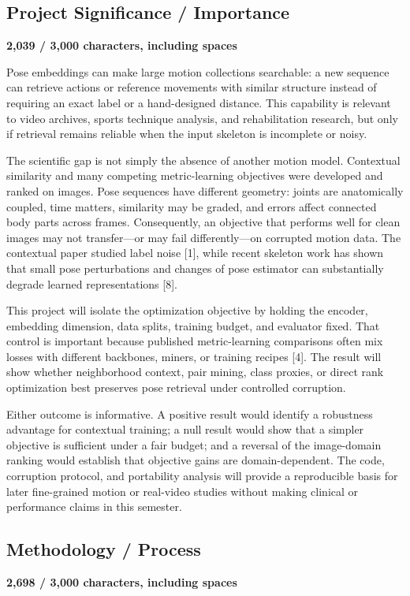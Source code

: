 \documentclass[11pt,letterpaper]{article}
\newcommand{\CharCount}[2]{%
  \begin{flushright}
    \vspace{-7pt}
    {\color{Muted}\bfseries\footnotesize #1 / #2 characters, including spaces}
  \end{flushright}
  \vspace{-3pt}
}
\begin{document}
\subsection*{Project Significance / Importance}
\CharCount{2,039}{3,000}

Pose embeddings can make large motion collections searchable: a new sequence can retrieve actions or reference movements with similar structure instead of requiring an exact label or a hand-designed distance. This capability is relevant to video archives, sports technique analysis, and rehabilitation research, but only if retrieval remains reliable when the input skeleton is incomplete or noisy.

The scientific gap is not simply the absence of another motion model. Contextual similarity and many competing metric-learning objectives were developed and ranked on images. Pose sequences have different geometry: joints are anatomically coupled, time matters, similarity may be graded, and errors affect connected body parts across frames. Consequently, an objective that performs well for clean images may not transfer---or may fail differently---on corrupted motion data. The contextual paper studied label noise [1], while recent skeleton work has shown that small pose perturbations and changes of pose estimator can substantially degrade learned representations [8].

This project will isolate the optimization objective by holding the encoder, embedding dimension, data splits, training budget, and evaluator fixed. That control is important because published metric-learning comparisons often mix losses with different backbones, miners, or training recipes [4]. The result will show whether neighborhood context, pair mining, class proxies, or direct rank optimization best preserves pose retrieval under controlled corruption.

Either outcome is informative. A positive result would identify a robustness advantage for contextual training; a null result would show that a simpler objective is sufficient under a fair budget; and a reversal of the image-domain ranking would establish that objective gains are domain-dependent. The code, corruption protocol, and portability analysis will provide a reproducible basis for later fine-grained motion or real-video studies without making clinical or performance claims in this semester.

\subsection*{Methodology / Process}
\CharCount{2,698}{3,000}
\end{document}
